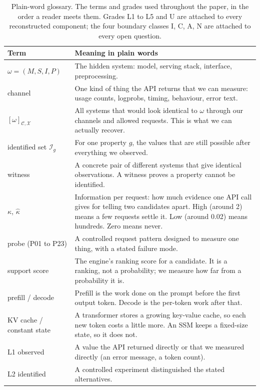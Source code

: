 \begin{table}[!htb]\centering\footnotesize
\caption{Plain-word glossary.  The terms and grades used throughout the paper, in the
order a reader meets them.  Grades L1 to L5 and U are attached to every reconstructed
component; the four boundary classes I, C, A, N are attached to every open question.}
\label{tab:glossary}
\begin{tabularx}{\textwidth}{@{}l Y@{}}
\toprule
\textbf{Term} & \textbf{Meaning in plain words}\\
\midrule
$\omega=(M,S,I,P)$ & The hidden system: model, serving stack, interface, preprocessing.\\
channel & One kind of thing the API returns that we can measure: usage counts, logprobs, timing, behaviour, error text.\\
$[\omega]_{\mathcal C,\mathcal X}$ & All systems that would look identical to $\omega$ through our channels and allowed requests.  This is what we can actually recover.\\
identified set $\mathcal I_g$ & For one property $g$, the values that are still possible after everything we observed.\\
witness & A concrete pair of different systems that give identical observations.  A witness proves a property cannot be identified.\\
$\kappa$, $\hat\kappa$ & Information per request: how much evidence one API call gives for telling two candidates apart.  High (around 2) means a few requests settle it.  Low (around 0.02) means hundreds.  Zero means never.\\
probe (P01 to P23) & A controlled request pattern designed to measure one thing, with a stated failure mode.\\
support score & The engine's ranking score for a candidate.  It is a ranking, not a probability; we measure how far from a probability it is.\\
prefill / decode & Prefill is the work done on the prompt before the first output token.  Decode is the per-token work after that.\\
KV cache / constant state & A transformer stores a growing key-value cache, so each new token costs a little more.  An SSM keeps a fixed-size state, so it does not.\\
\midrule
L1 observed & A value the API returned directly or that we measured directly (an error message, a token count).\\
L2 identified & A controlled experiment distinguished the stated alternatives.\\

\end{tabularx}
\end{table}
